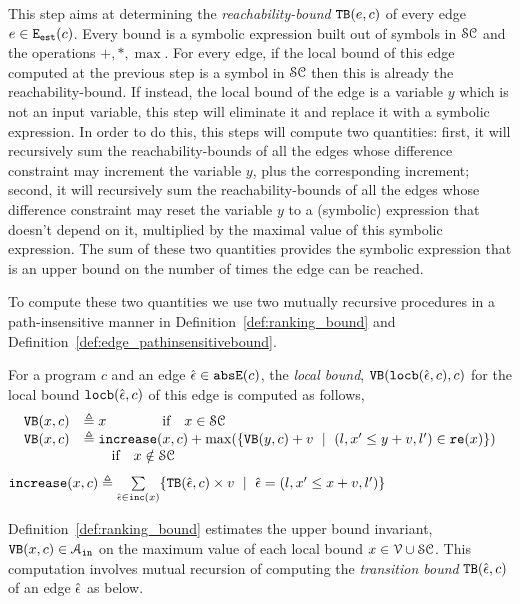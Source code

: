 \begin{enumerate}
This step aims at determining the \emph{reachability-bound} ${\mathtt{TB}}(e, c)$ of every edge $e\in \mathtt{{E_{est}}}(c)$.
Every bound is a symbolic expression built out of symbols in $\mathcal{SC}$ and the operations $+, *, \max$.
For every edge, if the local bound of this edge computed at the previous step is a symbol in $\mathcal{SC}$ then this is already the reachability-bound. 
If instead, the local bound of the edge is a variable $y$ which is not an input variable, this step will eliminate it and replace it with a symbolic expression.
In order to do this, this steps will compute two quantities: first, it will recursively sum the reachability-bounds of all the edges whose difference constraint may increment the variable $y$, plus the corresponding increment;
second, it will recursively sum the reachability-bounds of all the edges whose difference constraint may reset the variable $y$ to a (symbolic) expression that doesn't depend on it, multiplied by the maximal value of this symbolic expression. The sum of these two quantities provides the symbolic expression that is an upper bound on the number of times the edge can be reached.

To compute these two quantities we use two mutually recursive procedures in a path-insensitive manner
in Definition~\ref{def:ranking_bound} and Definition~\ref{def:edge_pathinsensitivebound}.
\begin{defn}
 \label{def:ranking_bound}
For a program $c$ and an edge $\hat{\mathtt{\epsilon}{}} \in \mathtt{abs}{\mathtt{E}}(c)$,
the \emph{local bound}, ${\mathtt{VB}}(\mathtt{locb}(\hat{\mathtt{\epsilon}{}}, c), c)$ for the local bound $\mathtt{locb}(\hat{\mathtt{\epsilon}{}}, c)$
of this edge
is computed as follows,
 \[ 
\begin{array}{lll}
 {\ensuremath{\mathtt{VB}}}(x, c) & \triangleq x \qquad \qquad \text{if} \quad x \in \mathcal{SC} \\
 {\mathtt{VB}}(x, c) & \triangleq \mathtt{increase}(x, c) + 
 \max(\{{\mathtt{VB}}(y, c) + v ~\mid~ (l, x' \leq y + v, l') \in \mathtt{re}(x)\}) \\
 & \qquad \text{if} \quad x \notin \mathcal{SC}
\end{array}
\]
%
$\mathtt{increase}(x, c) \triangleq \sum\limits_{\hat{\mathtt{\epsilon}{}} \in \mathtt{inc}(x)}\{{\mathtt{TB}}(\hat{\mathtt{\epsilon}{}}, c) \times v ~\mid~ 
\hat{\mathtt{\epsilon}{}} = (l, x' \leq x + v, l')\}$
\end{defn}

Definition~\ref{def:ranking_bound} estimates the upper bound invariant, ${\mathtt{VB}}(x, c) \in \mathcal{A}_{\mathtt{in}}$
on the maximum value of each local bound $x \in \mathcal{V} \cup \mathcal{SC}$.
This computation involves mutual recursion of computing the \emph{transition bound} ${\mathtt{TB}}(\hat{\mathtt{\epsilon}{}}, c)$ of an edge $\hat{\mathtt{\epsilon}{}}$ as below.


\end{enumerate}
